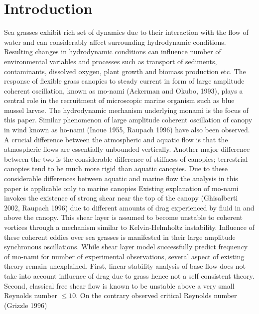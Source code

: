 \documentclass[aps,twocolumn,floatfix,prl,10pt]{revtex4-1}
\begin{document}
\section{Introduction}
Sea grasses exhibit rich set of dynamics due to their interaction with the flow of water and can considerably affect surrounding hydrodynamic conditions.
Resulting changes in hydrodynamic conditions can influence number of environmental variables and processes such as 
transport of sediments, contaminants, dissolved oxygen, plant growth and biomass production etc. 
The response of flexible grass canopies to steady current in form of large amplitude coherent oscillation, known as mo-nami (Ackerman and Okubo, 1993), plays a central role
in the recruitment of microscopic marine organism such as blue mussel larvae. The hydrodynamic mechanism underlying monami is the focus of this paper. 
\newline
Similar phenomenon of large amplitude coherent oscillation of canopy in wind known as ho-nami (Inoue 1955, Raupach 1996) have also been observed.
A crucial difference between the atmospheric and aquatic flow is that the atmospheric flows are essentially unbounded vertically. Another major
difference between the two is the considerable difference of stiffness of canopies; terrestrial canopies tend to be much more rigid than aquatic canopies.
Due to these considerable differences between aquatic and marine flow the analysis in this paper is applicable only to marine canopies  
\newline   
Existing explanation of mo-nami invokes the existence of strong shear near the top of the canopy (Ghisalberti 2002, Raupach 1996) due to
different amounts of drag experienced by fluid in and above the canopy. This shear layer is assumed to become unstable to coherent vortices through a mechanism similar to Kelvin-Helmholtz
instability. Influence of these coherent eddies over sea grasses is manifested in their large amplitude synchronous oscillations.
\newline
While shear layer model successfully predict frequency of mo-nami for number of experimental observations,
several aspect of existing theory remain unexplained. First, linear stability analysis of base flow does not take into account influence of drag due to grass hence not a self consistent 
theory. Second, classical free shear flow is known to be unstable above a very small Reynolds number $\leq 10 $. On the contrary observed critical Reynolds number (Grizzle 1996) 
\end{document}
